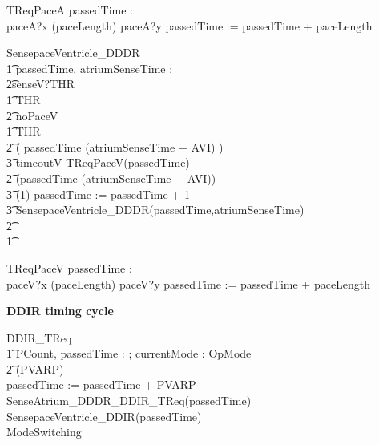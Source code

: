 \begin{circusaction}
	TReqPaceA \circdef \circvres passedTime : \nat \circspot \\
	paceA?x \then \circwait(paceLength) \circseq paceA?y \then passedTime := passedTime + paceLength 
\end{circusaction}



\begin{circusaction}
SensepaceVentricle\_DDDR \circdef \\
\t1 \circvres passedTime, atriumSenseTime : \nat \\
\t2\circspot senseV?THR \then \\
\t1 \circif  THR  \circthen\\
\t2 noPaceV \then \Skip \\
\t1 \circelse \lnot  THR  \circthen\\
\t2 \circif  ( passedTime \geq (atriumSenseTime + AVI) ) \circthen \\
\t3 timeoutV \then TReqPaceV(passedTime) \\
\t2 \circelse \lnot (passedTime \geq (atriumSenseTime + AVI)) \circthen \\
\t3  \circwait(1) \circseq passedTime := passedTime + 1 \circseq\\
\t3  SensepaceVentricle\_DDDR(passedTime,atriumSenseTime) \\
\t2 \circfi\\ 
\t1 \circfi \\ 
\end{circusaction}



\begin{circusaction}
	TReqPaceV \circdef \circvres passedTime : \nat \circspot \\
	paceV?x \then \circwait(paceLength) \circseq paceV?y \then passedTime := passedTime + paceLength 
\end{circusaction}




\textbf{DDIR timing cycle}

\begin{circusaction}
	DDIR\_TReq \circdef \\
  \t1 \circvres PCount, passedTime : \nat ; \circvres currentMode : OpMode \\
  \t2 \circspot 
  \circwait(PVARP) \circseq \\
   passedTime := passedTime + PVARP \circseq \\
   SenseAtrium\_DDDR\_DDIR\_TReq(passedTime) \circseq \\
   SensepaceVentricle\_DDIR(passedTime) \circseq \\
   ModeSwitching  
\end{circusaction}


